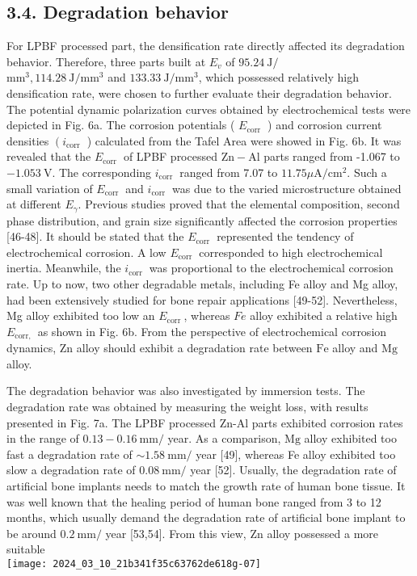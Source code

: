 \documentclass[10pt]{article}
\begin{document}
\subsection*{3.4. Degradation behavior}
For LPBF processed part, the densification rate directly affected its degradation behavior. Therefore, three parts built at $E_{v}$ of $95.24 \mathrm{~J} /$\\
$\mathrm{mm}^{3}, 114.28 \mathrm{~J} / \mathrm{mm}^{3}$ and $133.33 \mathrm{~J} / \mathrm{mm}^{3}$, which possessed relatively high densification rate, were chosen to further evaluate their degradation behavior. The potential dynamic polarization curves obtained by electrochemical tests were depicted in Fig. 6a. The corrosion potentials ( $E_{\text {corr }}$ ) and corrosion current densities $\left(i_{\text {corr }}\right.$ ) calculated from the Tafel Area were showed in Fig. 6b. It was revealed that the $E_{\text {corr }}$ of LPBF processed $\mathrm{Zn}-\mathrm{Al}$ parts ranged from -1.067 to $-1.053 \mathrm{~V}$. The corresponding $i_{\text {corr }}$ ranged from 7.07 to $11.75 \mu \mathrm{A} / \mathrm{cm}^{2}$. Such a small variation of $E_{\text {corr }}$ and $i_{\text {corr }}$ was due to the varied microstructure obtained at different $E_{\gamma}$. Previous studies proved that the elemental composition, second phase distribution, and grain size significantly affected the corrosion properties [46-48]. It should be stated that the $E_{\text {corr }}$ represented the tendency of electrochemical corrosion. A low $E_{\text {corr }}$ corresponded to high electrochemical inertia. Meanwhile, the $i_{\text {corr }}$ was proportional to the electrochemical corrosion rate. Up to now, two other degradable metals, including Fe alloy and Mg alloy, had been extensively studied for bone repair applications [49-52]. Nevertheless, Mg alloy exhibited too low an $E_{\text {corr }}$, whereas $F e$ alloy exhibited a relative high $E_{\text {corr, }}$ as shown in Fig. 6b. From the perspective of electrochemical corrosion dynamics, Zn alloy should exhibit a degradation rate between $\mathrm{Fe}$ alloy and $\mathrm{Mg}$ alloy.

The degradation behavior was also investigated by immersion tests. The degradation rate was obtained by measuring the weight loss, with results presented in Fig. 7a. The LPBF processed Zn-Al parts exhibited corrosion rates in the range of $0.13-0.16 \mathrm{~mm} /$ year. As a comparison, $\mathrm{Mg}$ alloy exhibited too fast a degradation rate of $\sim 1.58 \mathrm{~mm} /$ year [49], whereas Fe alloy exhibited too slow a degradation rate of $0.08 \mathrm{~mm} /$ year [52]. Usually, the degradation rate of artificial bone implants needs to match the growth rate of human bone tissue. It was well known that the healing period of human bone ranged from 3 to 12 months, which usually demand the degradation rate of artificial bone implant to be around $0.2 \mathrm{~mm} /$ year [53,54]. From this view, Zn alloy possessed a more suitable\\
\texttt{[image: 2024\_03\_10\_21b341f35c63762de618g-07]}
\end{document}
